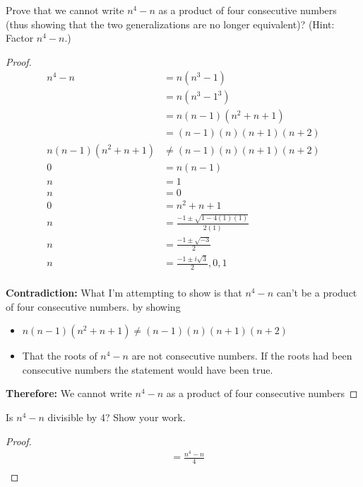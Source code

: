 \documentclass{article}
\begin{document}
\begin{itemize}
    \item[a.] Prove that we cannot write $n^4 - n$ as a product of four consecutive numbers
    (thus showing that the two generalizations are no longer equivalent)? (Hint:
    Factor $n^4 - n$.)
    \begin{proof}
        \begin{align*}
            n^4 - n &= n(n^3 - 1) \\
            &= n(n^3 - 1^3) \\
            &= n(n - 1)(n^2 + n + 1)\\
            &= (n - 1)(n)(n + 1)(n + 2) \\
            n(n - 1)(n^2 + n + 1) &\neq (n - 1)(n)(n + 1)(n + 2) \\ 
            0 &= n(n - 1) \\
            n &= 1 \\
            n &= 0 \\
            0 &= n^2 + n + 1 \\
            n &= \frac{-1 \pm \sqrt{1 - 4(1)(1)}}{2(1)} \\
            n &= \frac{-1 \pm \sqrt{-3}}{2} \\
            n &= \frac{-1 \pm i\sqrt{3}}{2}, 0, 1 \\                  
        \end{align*}
        \item[] \textbf{Contradiction:} What I'm attempting to show is that $n^4 - n$ can't be a product of four consecutive numbers.
        by showing 
        \begin{itemize}
            \item[1.] $n(n - 1)(n^2 + n + 1) \neq (n - 1)(n)(n + 1)(n + 2)$
            \item[2.] That the roots of $n^4 - n$ are not consecutive numbers. If the roots had been consecutive numbers the statement would have been true.
        \end{itemize}
        \item[] \textbf{Therefore:} We cannot write $n^4 - n$ as a product of four consecutive numbers        
    \end{proof}
    \item[]   
    \item[b.]  Is $n^4 - n$ divisible by 4? Show your work.
    \begin{proof}
        \begin{align*}
            &= \frac{n^4 - n}{4} \\

\end{align*}
\end{proof}
\end{itemize}
\end{document}
